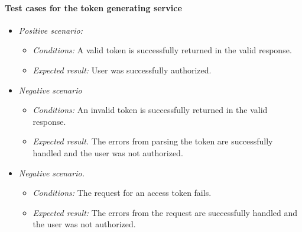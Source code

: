 \paragraph*{Test cases for the token generating service} 
\begin{itemize}
    \item \emph{Positive scenario:} 
        \begin{itemize}
            \item \emph{Conditions:} A valid token is successfully returned in the valid response.
            \item \emph{Expected result:} User was successfully authorized.
        \end{itemize}
    \item \emph{Negative scenario} 
        \begin{itemize}
            \item \emph{Conditions:} An invalid token is successfully returned in the valid response.
            \item \emph{Expected result.} The errors from parsing the token are successfully handled and the user was not authorized.
        \end{itemize}
    \item \emph{Negative scenario.} 
        \begin{itemize}
            \item \emph{Conditions:} The request for an access token fails.
            \item \emph{Expected result:} The errors from the request are successfully handled and the user was not authorized.
        \end{itemize}
    
\end{itemize}

